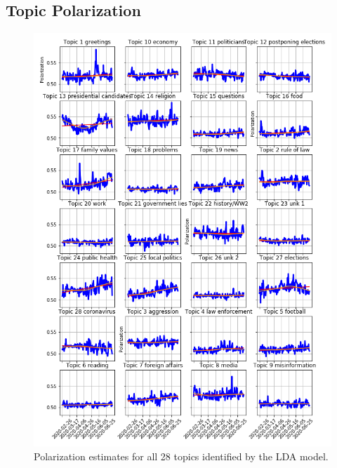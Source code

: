 \documentclass{article}
\begin{document}
	\clearpage
	
	\subsection{Topic Polarization}
	
	\begin{figure}[!h]
		\centering
		\includegraphics[width=0.8\columnwidth]{figures/polarization_topics_all.png}
		\caption{Polarization estimates for all 28 topics identified by the LDA model.}
		\label{fig:polarization_topics_all}
	\end{figure}

	\clearpage
\end{document}
